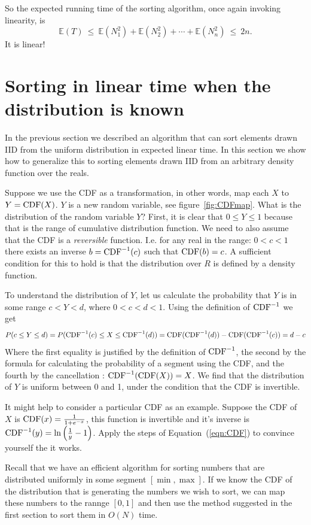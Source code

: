 \documentclass{report}
\theoremstyle{plain}
\theoremstyle{definition}
\newcommand{\E}{\mathbb{E}}
\begin{document}
So the expected running time of the sorting algorithm, once again invoking linearity, is
$$ \E(T) 
\ \leq \ \E(N_1^2) + \E(N_2^2) + \cdots + \E(N_n^2) 
\ \leq \ 2n
.$$
It is linear!

\section{Sorting in linear time when the distribution is known}

In the previous section we described an algorithm that can sort
elements drawn IID from the uniform distribution in expected linear
time. In this section we show how to generalize this to sorting
elements drawn IID from an arbitrary density function over the reals.

Suppose we use the CDF as a transformation, in other words, map each
$X$ to $Y=\mbox{CDF}(X)$. $Y$ is a new random variable, see
figure~\ref{fig:CDFmap}. What is the distribution of the random
variable $Y$? First, it is clear that $0 \leq Y \leq 1$ because that
is the range of cumulative distribution function. We need to also
assume that the CDF is a {\em reversible} function. I.e. for any real
in the range: $0<c<1$ there exists an inverse $b=\mbox{CDF}^{-1}(c)$ such
that $\mbox{CDF}(b)=c$. A sufficient condition for this to hold is that the
distribution over $R$ is defined by a density function.

To understand the distribution of $Y$, let us calculate the
probability that $Y$ is in some range $c<Y<d$, where $0<c<d<1$.
Using the definition of $\mbox{CDF}^{-1}$ we get
\begin{equation} \label{eqn:CDF}
P(c \leq Y \leq d) = P(\mbox{CDF}^{-1}(c) \leq X \leq \mbox{CDF}^{-1}(d)) =
\mbox{CDF}(\mbox{CDF}^{-1}(d))-\mbox{CDF}(\mbox{CDF}^{-1}(c)) = d-c
\end{equation}
Where the first equality is justified by the definition of
$\mbox{CDF}^{-1}$, the second by the formula for calculating the probability
of a segment using the CDF, and the fourth by the cancellation :
$\mbox{CDF}^{-1}(\mbox{CDF}(X))=X$.  We find that the distribution of $Y$ is
uniform between 0 and 1, under the condition that the CDF is invertible.

It might help to consider a particular CDF as an example. Suppose the
CDF of $X$ is $\mbox{CDF}(x) = \frac{1}{1+e^{-x}}$, this function is
invertible and it's inverse is
$\mbox{CDF}^{-1}(y)=\ln\left(\frac{1}{y}-1\right)$. Apply the steps of
Equation~(\ref{eqn:CDF}) to convince yourself the it works.

Recall that we have an efficient algorithm for sorting numbers that
are distributed uniformly in some segment $[\min,\max]$.
If we know the CDF of the distribution that is generating the
numbers we wish to sort, we can map these numbers to the rannge
$[0,1]$ and then use the method suggested in the first section to sort
them in $O(N)$ time.
\end{document}

